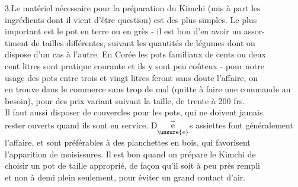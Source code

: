 3.\quad Le matériel nécessaire pour la préparation du Kimchi (mis à part les\\
ingrédients dont il vient d'être question) est des plus simples. Le plus\\
important est le pot en terre ou en grès - il est bon d'en avoir un assor-\\
timent de tailles différentes, suivant les quantités de légumes dont on\\
dispose d'un cas à l'autre. En Corée les pots familiaux de cents ou deux\\
cent litres sont pratique courante et ils y sont peu coûteux - pour notre\\
usage des pots entre trois et vingt litres feront sans doute l'affaire, on\\
en trouve dans le commerce sans trop de mal (quitte à faire une commande au\\
besoin), pour des prix variant suivant la taille, de trente à 200 frs.\\
Il faut aussi disposer de couvercles pour les pots, qui ne doivent jamais\\
rester ouverts quand ils sont en service. D$\underset{\unsure{e}}{\overset{-}{\mathrm e}}$s assiettes font généralement\\
l'affaire, et sont préférables à des planchettes en bois, qui favorisent\\
l'apparition de moisissures. Il est bon quand on prépare le Kimchi de\\
choisir un pot de taille approprié, de façon qu'il soit à peu près rempli\\
et non à demi plein seulement, pour éviter un grand contact d'air.

